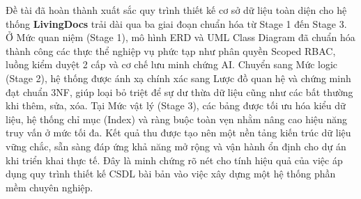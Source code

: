 Đề tài đã hoàn thành xuất sắc quy trình thiết kế cơ sở dữ liệu toàn diện cho hệ thống \textbf{LivingDocs} trải dài qua ba giai đoạn chuẩn hóa từ Stage 1 đến Stage 3. 
Ở Mức quan niệm (Stage 1), mô hình ERD và UML Class Diagram đã chuẩn hóa thành công các thực thể nghiệp vụ phức tạp như phân quyền Scoped RBAC, luồng kiểm duyệt 2 cấp và cơ chế lưu minh chứng AI. 
Chuyển sang Mức logic (Stage 2), hệ thống được ánh xạ chính xác sang Lược đồ quan hệ và chứng minh đạt chuẩn 3NF, giúp loại bỏ triệt để sự dư thừa dữ liệu cũng như các bất thường khi thêm, sửa, xóa. 
Tại Mức vật lý (Stage 3), các bảng được tối ưu hóa kiểu dữ liệu, hệ thống chỉ mục (Index) và ràng buộc toàn vẹn nhằm nâng cao hiệu năng truy vấn ở mức tối đa. 
Kết quả thu được tạo nên một nền tảng kiến trúc dữ liệu vững chắc, sẵn sàng đáp ứng khả năng mở rộng và vận hành ổn định cho dự án khi triển khai thực tế. 
Đây là minh chứng rõ nét cho tính hiệu quả của việc áp dụng quy trình thiết kế CSDL bài bản vào việc xây dựng một hệ thống phần mềm chuyên nghiệp.